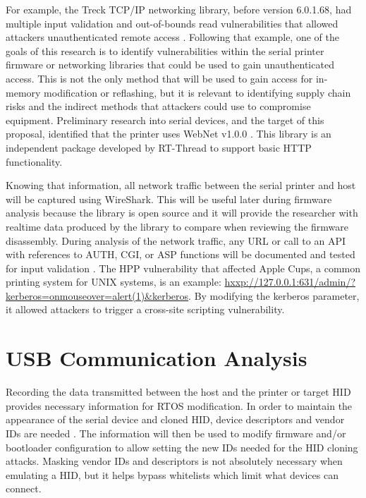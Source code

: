 For example, the Treck TCP/IP networking library, before version 6.0.1.68, had multiple input validation and out-of-bounds read vulnerabilities that allowed attackers unauthenticated remote access \autocite{NVDCVE202025066,NVDCVE202027336,NVDCVE202027338,NVDCVE202027337}. Following that example, one of the goals of this research is to identify vulnerabilities within the serial printer firmware or networking libraries that could be used to gain unauthenticated access. This is not the only method that will be used to gain access for in-memory modification or reflashing, but it is relevant to identifying supply chain risks and the indirect methods that attackers could use to compromise equipment. Preliminary research into serial devices, and the target of this proposal, identified that the printer uses WebNet v1.0.0 \autocite{RTThreadpackagesWebnet2024}. This library is an independent package developed by RT-Thread to support basic HTTP functionality.

Knowing that information, all network traffic between the serial printer and host will be captured using WireShark. This will be useful later during firmware analysis because the library is open source and it will provide the researcher with realtime data produced by the library to compare when reviewing the firmware disassembly. During analysis of the network traffic, any URL or call to an API with references to AUTH, CGI, or ASP functions will be documented and tested for input validation \autocite{WSTGLatestOWASP}. The HPP vulnerability that affected Apple Cups, a common printing system for UNIX systems, is an example: \url{hxxp://127.0.0.1:631/admin/?kerberos=onmouseover=alert(1)&kerberos}. By modifying the kerberos parameter, it allowed attackers to trigger a cross-site scripting vulnerability.

\section{USB Communication Analysis} \label{usbcommanalysis}

Recording the data transmitted between the host and the printer or target HID provides necessary information for RTOS modification. In order to maintain the appearance of the serial device and cloned HID, device descriptors and vendor IDs are needed \autocite{karystinosSpyduinoArduinoHID2019,SoKPlugPray}. The information will then be used to modify firmware and/or bootloader configuration to allow setting the new IDs needed for the HID cloning attacks. Masking vendor IDs and descriptors is not absolutely necessary when emulating a HID, but it helps bypass whitelists which limit what devices can connect.

